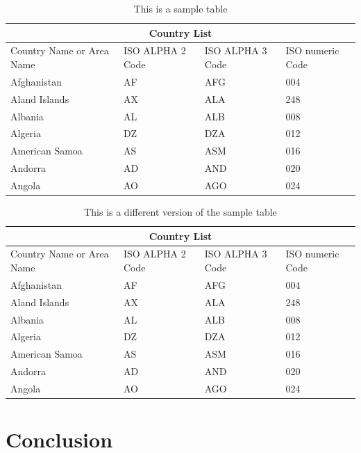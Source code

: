 \documentclass[11pt]{article}
\begin{document}
\begin{table}[H]
\centering
\caption{This is a sample table}\label{tab:1}
\begin{tabular}{ |p{3cm}||p{3cm}|p{3cm}|p{3cm}|  }
 \hline
 \multicolumn{4}{|c|}{Country List} \\
 \hline
 Country Name     or Area Name& ISO ALPHA 2 Code &ISO ALPHA 3 Code&ISO numeric Code\\
 \hline
 Afghanistan   & AF    &AFG&   004\\
 Aland Islands&   AX  & ALA   &248\\
 Albania &AL & ALB&  008\\
 Algeria    &DZ & DZA&  012\\
 American Samoa&   AS  & ASM&016\\
 Andorra& AD  & AND   &020\\
 Angola& AO  & AGO&024\\
 \hline
\end{tabular}
\end{table}

\lipsum[4]

\begin{table}[H]
\centering
\caption{This is a different version of the sample table}\label{tab:2}
\begin{tabular}{@{}llll@{}}
 \toprule
 \multicolumn{4}{c}{Country List} \\
 \midrule
 Country Name     or Area Name& ISO ALPHA 2 Code &ISO ALPHA 3 Code&ISO numeric Code\\
 \hline
 Afghanistan   & AF    &AFG&   004\\
 Aland Islands&   AX  & ALA   &248\\
 Albania &AL & ALB&  008\\
 Algeria    &DZ & DZA&  012\\
 American Samoa&   AS  & ASM&016\\
 Andorra& AD  & AND   &020\\
 Angola& AO  & AGO&024\\
 \bottomrule
\end{tabular}
\end{table}

\lipsum[8]



\section{Conclusion}
\lipsum[9]
\end{document}
